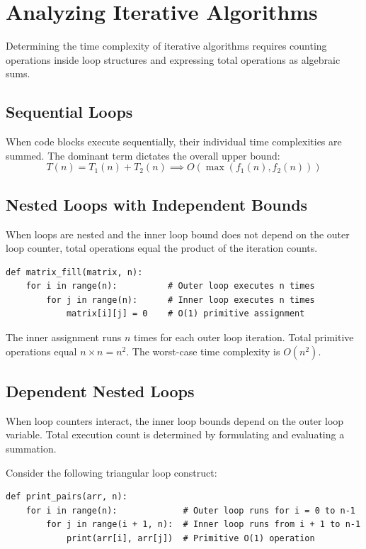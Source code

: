 \documentclass[12pt]{report}
\begin{document}
\section{Analyzing Iterative Algorithms}

Determining the time complexity of iterative algorithms requires counting operations inside loop structures and expressing total operations as algebraic sums.

\subsection{Sequential Loops}

When code blocks execute sequentially, their individual time complexities are summed. The dominant term dictates the overall upper bound:
\[
T(n) = T_1(n) + T_2(n) \implies O(\max(f_1(n), f_2(n)))
\]

\subsection{Nested Loops with Independent Bounds}

When loops are nested and the inner loop bound does not depend on the outer loop counter, total operations equal the product of the iteration counts.

\begin{verbatim}
def matrix_fill(matrix, n):
    for i in range(n):          # Outer loop executes n times
        for j in range(n):      # Inner loop executes n times
            matrix[i][j] = 0    # O(1) primitive assignment
\end{verbatim}

The inner assignment runs $n$ times for each outer loop iteration. Total primitive operations equal $n \times n = n^2$. The worst-case time complexity is $O(n^2)$.

\subsection{Dependent Nested Loops}

When loop counters interact, the inner loop bounds depend on the outer loop variable. Total execution count is determined by formulating and evaluating a summation.

Consider the following triangular loop construct:

\begin{verbatim}
def print_pairs(arr, n):
    for i in range(n):             # Outer loop runs for i = 0 to n-1
        for j in range(i + 1, n):  # Inner loop runs from i + 1 to n-1
            print(arr[i], arr[j])  # Primitive O(1) operation
\end{verbatim}
\end{document}
